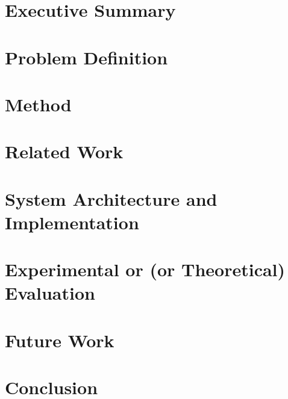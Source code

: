 \section{Executive Summary}




\section{Problem Definition}




\section{Method}




\section{Related Work}




\section{System Architecture and Implementation}




\section{Experimental or (or Theoretical) Evaluation}




\section{Future Work}




\section{Conclusion}




